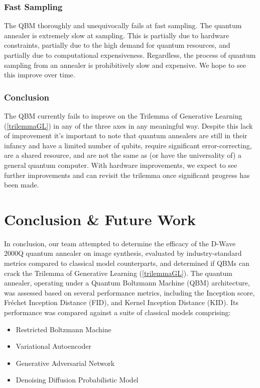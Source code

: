\documentclass[%
 reprint,
 amsmath,amssymb,
 aps,
]{revtex4-2}
\begin{document}
\subsubsection{Fast Sampling}
The QBM thoroughly and unequivocally fails at fast sampling. The quantum annealer is extremely slow at sampling. This is partially due to hardware constraints, partially due to the high demand for quantum resources, and partially due to computational expensiveness. Regardless, the process of quantum sampling from an annealer is prohibitively slow and expensive. We hope to see this improve over time.

\subsubsection{Conclusion}
The QBM currently fails to improve on the Trilemma of Generative Learning (\ref{trilemmaGL}) in any of the three axes in any meaningful way. Despite this lack of improvement it's important to note that quantum annealers are still in their infancy and have a limited number of qubits, require significant error-correcting, are a shared resource, and are not the same as (or have the universality of) a general quantum computer. With hardware improvements, we expect to see further improvements and can revisit the trilemma once significant progress has been made.

\section{Conclusion \& Future Work}
\label{future}
In conclusion, our team attempted to determine the efficacy of the D-Wave 2000Q quantum annealer on image synthesis, evaluated by industry-standard metrics compared to classical model counterparts, and determined if QBMs can crack the Trilemma of Generative Learning (\ref{trilemmaGL}). The quantum annealer, operating under a Quantum Boltzmann Machine (QBM) architecture, was assessed based on several performance metrics, including the Inception score, Fréchet Inception Distance (FID), and Kernel Inception Distance (KID). Its performance was compared against a suite of classical models comprising:
\begin{itemize}
\item Restricted Boltzmann Machine
\item Variational Autoencoder
\item Generative Adversarial Network
\item Denoising Diffusion Probabilistic Model
\end{itemize}
\end{document}
